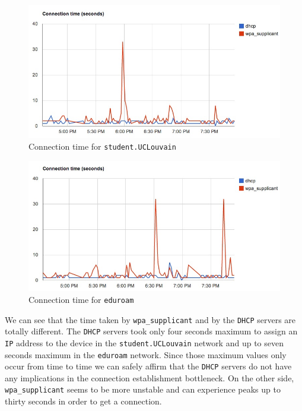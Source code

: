 \begin{figure}[H]
	\centering
   \includegraphics[width=1\textwidth]{Pictures/chapter6/time-student.jpg}
   \caption{Connection time for \texttt{student.UCLouvain}}
\end{figure} 

\begin{figure}[H]
	\centering
   \includegraphics[width=1\textwidth]{Pictures/chapter6/time-eduroam.jpg}
   \caption{Connection time for \texttt{eduroam}}
\end{figure} 

We can see that the time taken by \texttt{wpa\_supplicant} and by the \texttt{DHCP} servers are totally different. The \texttt{DHCP} servers took only four seconds maximum to assign an \texttt{IP} address to the device in the \texttt{student.UCLouvain} network and up to seven seconds maximum in the \texttt{eduroam} network. Since those maximum values only occur from time to time we can safely affirm that the \texttt{DHCP} servers do not have any implications in the connection establishment bottleneck. On the other side, \texttt{wpa\_supplicant} seems to be more unstable and can experience peaks up to thirty seconds in order to get a connection. 

